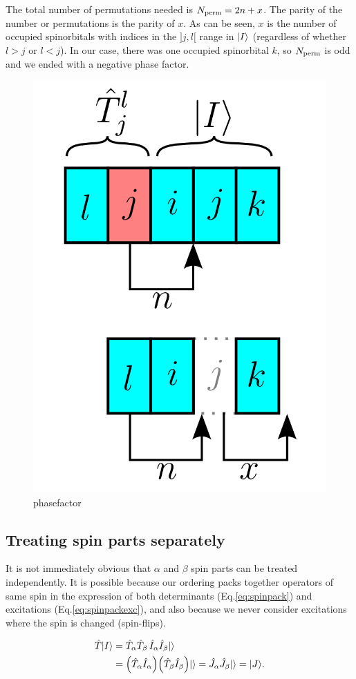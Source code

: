 \documentclass[./thesis.tex]{subfiles}
\begin{document}
The total number of permutations needed is ${N_\text{perm}} = 2n+x$. The parity of the number or permutations is the parity of $x$. As can be seen, $x$ is the number of occupied spinorbitals with indices in the $]j, l[$ range in ${\ket{I}}$ (regardless of whether $l>j$ or $l<j$). In our case, there was one occupied spinorbital $k$, so ${N_\text{perm}}$ is odd and we ended with a negative phase factor.

\begin{figure}[h!]
	\begin{center}
		\includegraphics[width=0.3\columnwidth]{figures/determinant_driven/phasefactor}
		\caption{
		\label{phasefactor}
		phasefactor
		}
	\end{center}
\end{figure}

\subsection{Treating spin parts separately}

It is not immediately obvious that $\alpha$ and $\beta$ spin parts can be treated independently. It is possible because our ordering packs together operators of same spin in the expression of both determinants (Eq.\eqref{eq:spinpack}) and excitations (Eq.\eqref{eq:spinpackexc}), and 
also because we never consider excitations where the spin is changed (spin-flips).

\begin{align}
\label{eq:spin1}
\hat{T} {\ket{I}} & = \hat{T}_\alpha \hat{T}_\beta \,  \hat{I}_\alpha \hat{I}_\beta {\ket{}} \\
\label{eq:spin2}
            & =  \qty(\hat{T}_\alpha \hat{I}_\alpha) \qty(\hat{T}_\beta  \hat{I}_\beta) {\ket{}} 
              = \hat{J}_\alpha \hat{J}_\beta  {\ket{}} = {\ket{J}}.
\end{align}
\end{document}
